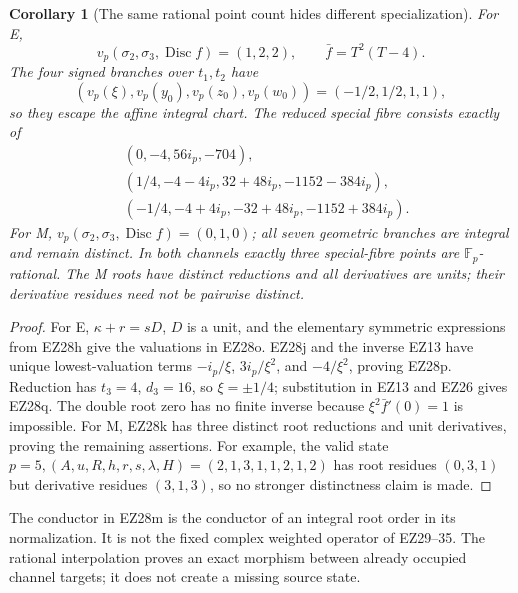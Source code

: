 \documentclass[11pt]{article}
\newtheorem{corollary}[theorem]{Corollary}
\theoremstyle{definition}\newtheorem{definition}[theorem]{Definition}
\theoremstyle{remark}\newtheorem{remark}[theorem]{Remark}
\newcommand{\F}{\mathbb F}
\newcommand{\Disc}{\operatorname{Disc}}
\begin{document}
\begin{corollary}[The same rational point count hides different specialization]
For E,
\begin{equation}
 v_p(\sigma_2,\sigma_3,\Disc f)=(1,2,2),\qquad
 \bar f=T^2(T-4).                                      \tag{EZ28o}
\end{equation}
The four signed branches over \(t_1,t_2\) have
\begin{equation}
 (v_p(\xi),v_p(y_0),v_p(z_0),v_p(w_0))
 =(-1/2,1/2,1,1),                                      \tag{EZ28p}
\end{equation}
so they escape the affine integral chart.  The reduced special fibre consists
exactly of
\begin{equation}
\begin{aligned}
 &(0,-4,56i_p,-704),\\
 &(1/4,-4-4i_p,32+48i_p,-1152-384i_p),\\
 &(-1/4,-4+4i_p,-32+48i_p,-1152+384i_p).
\end{aligned}                                             \tag{EZ28q}
\end{equation}
For M, \(v_p(\sigma_2,\sigma_3,\Disc f)=(0,1,0)\); all seven geometric
branches are integral and remain distinct.  In both channels exactly three
special-fibre points are \(\F_p\)-rational.  The M roots have distinct
reductions and all derivatives are units; their derivative residues need not
be pairwise distinct.
\end{corollary}

\begin{proof}
For E, \(\kappa+r=sD\), \(D\) is a unit, and the elementary symmetric
expressions from EZ28h give the valuations in EZ28o.  EZ28j and the inverse
EZ13 have unique lowest-valuation terms
\(-i_p/\xi\), \(3i_p/\xi^2\), and \(-4/\xi^2\), proving EZ28p.
Reduction has \(t_3=4\), \(d_3=16\), so \(\xi=\pm1/4\); substitution in
EZ13 and EZ26 gives EZ28q.  The double root zero has no finite inverse because
\(\xi^2\bar f'(0)=1\) is impossible.  For M, EZ28k has three distinct root
reductions and unit derivatives, proving the remaining assertions.  For
example, the valid state
\(p=5,(A,u,R,h,r,s,\lambda,H)=(2,1,3,1,1,2,1,2)\) has root residues
\((0,3,1)\) but derivative residues \((3,1,3)\), so no stronger distinctness
claim is made.
\end{proof}

The conductor in EZ28m is the conductor of an integral root order in its
normalization.  It is not the fixed complex weighted operator of EZ29--35.
The rational interpolation proves an exact morphism between already occupied
channel targets; it does not create a missing source state.
\end{document}
